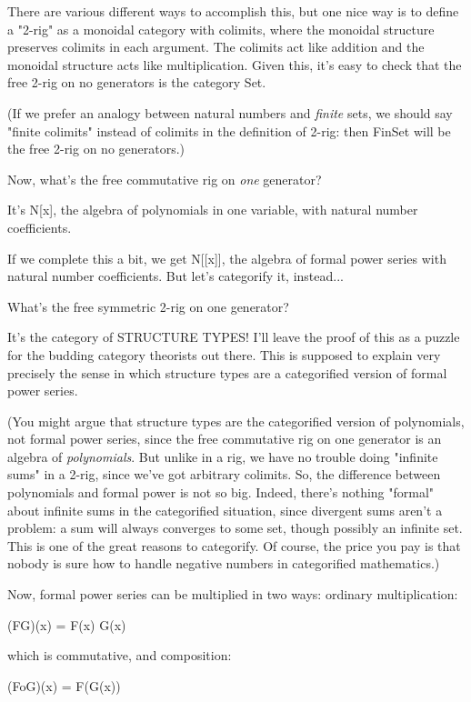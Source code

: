 There are various different ways to accomplish this, but one nice way is
to define a "2-rig" as a monoidal category with colimits,
where the monoidal structure preserves colimits in each argument.  The
colimits act like addition and the monoidal structure acts like
multiplication.  Given this, it's easy to check that the free 2-rig on
no generators is the category Set.

(If we prefer an analogy between natural numbers and \emph{finite} sets, we
should say "finite colimits" instead of colimits in the definition of
2-rig: then FinSet will be the free 2-rig on no generators.)

Now, what's the free commutative rig on \emph{one} generator?

It's N[x], the algebra of polynomials in one variable, with natural
number coefficients.

If we complete this a bit, we get N[[x]], the algebra of formal
power series with natural number coefficients.  But let's categorify
it, instead...

What's the free symmetric 2-rig on one generator?

It's the category of STRUCTURE TYPES!
I'll leave the proof of this as a puzzle for the budding category
theorists out there.  This is supposed to explain very precisely the
sense in which structure types are a categorified version of formal
power series.


(You might argue that structure types are the categorified version of
polynomials, not formal power series, since the free commutative rig on
one generator is an algebra of \emph{polynomials}.  But unlike in a
rig, we have no trouble doing "infinite sums" in a 2-rig,
since we've got arbitrary colimits.  So, the difference between
polynomials and formal power is not so big.  Indeed, there's nothing
"formal" about infinite sums in the categorified situation,
since divergent sums aren't a problem: a sum will always converges to
some set, though possibly an infinite set.  This is one of the great
reasons to categorify.  Of course, the price you pay is that nobody
is sure how to handle negative numbers in categorified mathematics.)

Now, formal power series can be multiplied in two ways: ordinary
multiplication:

(FG)(x) = F(x) G(x)

which is commutative, and composition: 

(FoG)(x) = F(G(x))

